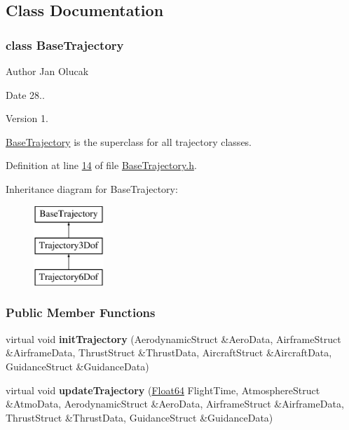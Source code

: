 \subsection{Class Documentation}
\label{class_base_trajectory}
\subsubsection{class Base\+Trajectory}
\begin{DoxyAuthor}{Author}
Jan Olucak 
\end{DoxyAuthor}
\begin{DoxyDate}{Date}
28.. 
\end{DoxyDate}
\begin{DoxyVersion}{Version}
1.
\end{DoxyVersion}
\hyperlink{group___trajectory_class_base_trajectory}{Base\+Trajectory} is the superclass for all trajectory classes. 

Definition at line \hyperlink{_base_trajectory_8h_source_l00014}{14} of file \hyperlink{_base_trajectory_8h_source}{Base\+Trajectory.\+h}.

Inheritance diagram for Base\+Trajectory\+:\begin{figure}[H]
\begin{center}
\leavevmode
\includegraphics[height=3.000000cm]{group___trajectory}
\end{center}
\end{figure}
\subsubsection*{Public Member Functions}
\begin{DoxyCompactItemize}
\item 
\mbox{\label{group___trajectory_ae424fdbe7ec9a60925931a97277975b2}} 
virtual void {\bfseries init\+Trajectory} (Aerodynamic\+Struct \&Aero\+Data, Airframe\+Struct \&Airframe\+Data, Thrust\+Struct \&Thrust\+Data, Aircraft\+Struct \&Aircraft\+Data, Guidance\+Struct \&Guidance\+Data)
\item 
\mbox{\label{group___trajectory_adb081d9287f12b50ccf60cc894dead4b}} 
virtual void {\bfseries update\+Trajectory} (\hyperlink{group___tools_ga3f1431cb9f76da10f59246d1d743dc2c}{Float64} Flight\+Time, Atmosphere\+Struct \&Atmo\+Data, Aerodynamic\+Struct \&Aero\+Data, Airframe\+Struct \&Airframe\+Data, Thrust\+Struct \&Thrust\+Data, Guidance\+Struct \&Guidance\+Data)
\end{DoxyCompactItemize}
\label{class_trajectory}
